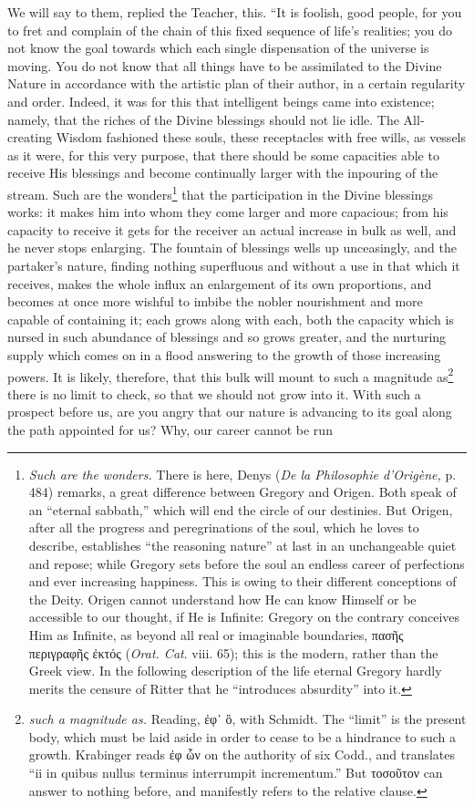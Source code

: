 We will say to them, replied the Teacher, this. “It is foolish, good people, for you to fret and complain of the chain of this fixed sequence of life’s realities; you do not know the goal towards which each single dispensation of the universe is moving. You do not know that all things have to be assimilated to the Divine Nature in accordance with the artistic plan of their author, in a certain regularity and order. Indeed, it was for this that intelligent beings came into existence; namely, that the riches of the Divine blessings should not lie idle. The All-creating Wisdom fashioned these souls, these receptacles with free wills, as vessels as it were, for this very purpose, that there should be some capacities able to receive His blessings and become continually larger with the inpouring of the stream. Such are the wonders\footnote{\emph{Such are the wonders.} There is here, Denys (\emph{De la Philosophie d’Origène,} p. 484) remarks, a great difference between Gregory and Origen. Both speak of an “eternal sabbath,” which will end the circle of our destinies. But Origen, after all the progress and peregrinations of the soul, which he loves to describe, establishes “the reasoning nature” at last in an unchangeable quiet and repose; while Gregory sets before the soul an endless career of perfections and ever increasing happiness. This is owing to their different conceptions of the Deity. Origen cannot understand how He can know Himself or be accessible to our thought, if He is Infinite: Gregory on the contrary conceives Him as Infinite, as beyond all real or imaginable boundaries, \textgreek{πασῆς περιγραφῆς ἐκτός} (\emph{Orat. Cat}. viii. 65); this is the modern, rather than the Greek view. In the following description of the life eternal Gregory hardly merits the censure of Ritter that he “introduces absurdity” into it.} that the participation in the Divine blessings works: it makes him into whom they come larger and more capacious; from his capacity to receive it gets for the receiver an actual increase in bulk as well, and he never stops enlarging. The fountain of blessings wells up unceasingly, and the partaker’s nature, finding nothing superfluous and without a use in that which it receives, makes the whole influx an enlargement of its own proportions, and becomes at once more wishful to imbibe the nobler nourishment and more capable of containing it; each grows along with each, both the capacity which is nursed in such abundance of blessings and so grows greater, and the nurturing supply which comes on in a flood answering to the growth of those increasing powers. It is likely, therefore, that this bulk will mount to such a magnitude as\footnote{\emph{such a magnitude as.} Reading, \textgreek{ἐφ᾽ ὃ}, with Schmidt. The “limit” is the present body, which must be laid aside in order to cease to be a hindrance to such a growth. Krabinger reads \textgreek{ἐφ ὧν} on the authority of six Codd., and translates “ii in quibus nullus terminus interrumpit incrementum.” But \textgreek{τοσοῦτον} can answer to nothing before, and manifestly refers to the relative clause.} there is no limit to check, so that we should not grow into it. With such a prospect before us, are you angry that our nature is advancing to its goal along the path appointed for us? Why, our career cannot be run 